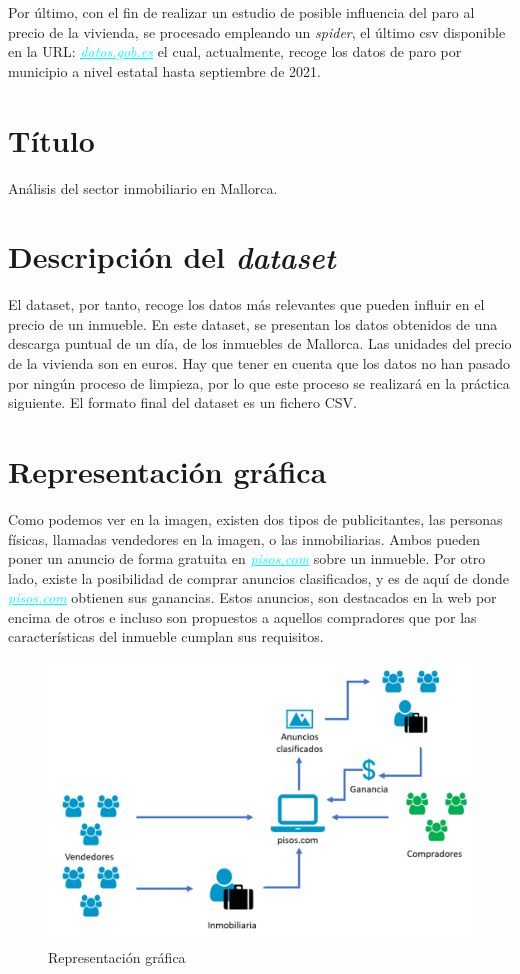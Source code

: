 \documentclass[a4paper, 12pt]{article}
\begin{document}
Por último, con el fin de realizar un estudio de posible influencia del paro al precio de la vivienda, se procesado empleando un {\itshape spider}, el último csv disponible en la URL:
\href{ https://datos.gob.es/es/catalogo/ea0021425-paro-registrado-por-municipios} {\textcolor{cyan}{\underline{{\itshape datos.gob.es}}}} el cual, actualmente, recoge los datos de paro por municipio a nivel estatal hasta septiembre de 2021.

\section{Título}

Análisis del sector inmobiliario en Mallorca.

\section{Descripción del {\itshape dataset}}

El dataset, por tanto, recoge los datos más relevantes que pueden influir en el precio de un inmueble. En este dataset, se presentan los datos obtenidos de una descarga puntual de un día, de los inmuebles de Mallorca. Las unidades del precio de la vivienda son en euros. Hay que tener en cuenta que los datos no han pasado por ningún proceso de limpieza, por lo que este proceso se realizará en la práctica siguiente. El formato final del dataset es un fichero CSV.

\section{Representación gráfica}

Como podemos ver en la imagen, existen dos tipos de publicitantes, las personas físicas, llamadas vendedores en la imagen, o las inmobiliarias. Ambos pueden poner un anuncio de forma gratuita en \href{https://www.pisos.com} {\textcolor{cyan}{\underline{{\itshape pisos.com}}}} sobre un inmueble. Por otro lado, existe la posibilidad de comprar anuncios clasificados, y es de aquí de donde \href{https://www.pisos.com} {\textcolor{cyan}{\underline{{\itshape pisos.com}}}} obtienen sus ganancias. Estos anuncios, son destacados en la web por encima de otros e incluso son propuestos a aquellos compradores que por las características del inmueble cumplan sus requisitos.

\begin{figure}[H]
	\centering
	\includegraphics[width=0.7\linewidth]{img/screenshot007}
	\caption{Representación gráfica}
	\label{fig:screenshot007}
\end{figure}
\end{document}
